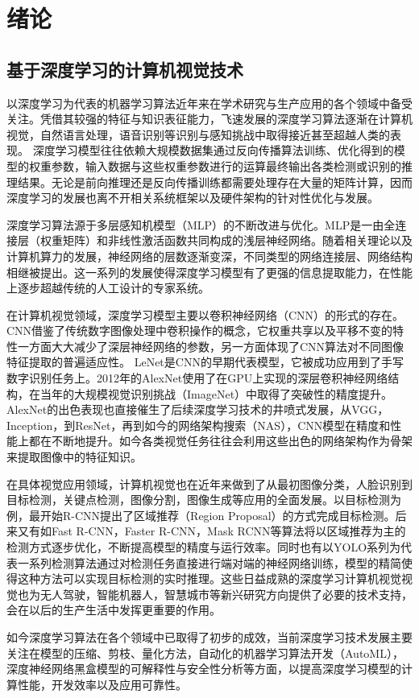
\chapter{绪论}

\section{基于深度学习的计算机视觉技术} \label{intro_dl}
以深度学习为代表的机器学习算法近年来在学术研究与生产应用的各个领域中备受关注。凭借其较强的特征与知识表征能力，飞速发展的深度学习算法逐渐在计算机视觉，自然语言处理，语音识别等识别与感知挑战中取得接近甚至超越人类的表现。%
深度学习模型往往依赖大规模数据集通过反向传播算法训练、优化得到的模型的权重参数，输入数据与这些权重参数进行的运算最终输出各类检测或识别的推理结果。无论是前向推理还是反向传播训练都需要处理存在大量的矩阵计算，因而深度学习的发展也离不开相关系统框架以及硬件架构的针对性优化与发展。\par
深度学习算法源于多层感知机模型（MLP）的不断改进与优化。MLP是一由全连接层（权重矩阵）和非线性激活函数共同构成的浅层神经网络。随着相关理论以及计算机算力的发展，神经网络的层数逐渐变深，不同类型的网络连接层、网络结构相继被提出。这一系列的发展使得深度学习模型有了更强的信息提取能力，在性能上逐步超越传统的人工设计的专家系统。\par
在计算机视觉领域，深度学习模型主要以卷积神经网络（CNN）的形式的存在。CNN借鉴了传统数字图像处理中卷积操作的概念，它权重共享以及平移不变的特性一方面大大减少了深层神经网络的参数，另一方面体现了CNN算法对不同图像特征提取的普遍适应性。
LeNet是CNN的早期代表模型，它被成功应用到了手写数字识别任务上。2012年的AlexNet使用了在GPU上实现的深层卷积神经网络结构，在当年的大规模视觉识别挑战（ImageNet）中取得了突破性的精度提升。AlexNet的出色表现也直接催生了后续深度学习技术的井喷式发展，从VGG，Inception，到ResNet，再到如今的网络架构搜索（NAS），CNN模型在精度和性能上都在不断地提升。如今各类视觉任务往往会利用这些出色的网络架构作为骨架来提取图像中的特征知识。\par
在具体视觉应用领域，计算机视觉也在近年来做到了从最初图像分类，人脸识别到目标检测，关键点检测，图像分割，图像生成等应用的全面发展。以目标检测为例，最开始R-CNN提出了区域推荐（Region Proposal）的方式完成目标检测。后来又有如Fast R-CNN，Faster R-CNN，Mask RCNN等算法将以区域推荐为主的检测方式逐步优化，不断提高模型的精度与运行效率。同时也有以YOLO系列为代表一系列检测算法通过对检测任务直接进行端对端的神经网络训练，模型的精简使得这种方法可以实现目标检测的实时推理。这些日益成熟的深度学习计算机视觉视觉也为无人驾驶，智能机器人，智慧城市等新兴研究方向提供了必要的技术支持，会在以后的生产生活中发挥更重要的作用。\par
如今深度学习算法在各个领域中已取得了初步的成效，当前深度学习技术发展主要关注在模型的压缩、剪枝、量化方法，自动化的机器学习算法开发（AutoML），深度神经网络黑盒模型的可解释性与安全性分析等方面，以提高深度学习模型的计算性能，开发效率以及应用可靠性。

